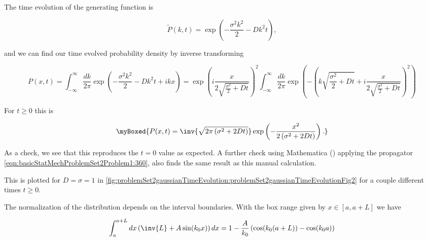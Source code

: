 {The time evolution of the generating function is

\begin{dmath}\label{eqn:basicStatMechProblemSet2Problem1:300}
\tilde{P}(k, t) 
= 
\exp\left(
-\frac{\sigma^2 k^2}{2} - D k^2 t
\right),
\end{dmath}

and we can find our time evolved probability density by inverse transforming

\begin{dmath}\label{eqn:basicStatMechProblemSet2Problem1:320}
P(x, t) 
= 
\int_{-\infty}^\infty \frac{dk}{2 \pi} 
\exp\left(
-\frac{\sigma^2 k^2}{2} - D k^2 t + i k x
\right)
=
\exp\left(
i \frac{x}{ 2 \sqrt{\frac{\sigma^2}{2} + D t} }
\right)^2
\int_{-\infty}^\infty \frac{dk}{2 \pi} 
\exp\left(
-\left(
k \sqrt{\frac{\sigma^2}{2} + D t} 
+ i \frac{x}{ 2 
\sqrt{\frac{\sigma^2}{2} + D t} 
}
\right)^2
\right)
\end{dmath}

For $t \ge 0$ this is

\begin{equation}\label{eqn:basicStatMechProblemSet2Problem1:340}
\myBoxed{
P(x, t) 
=
\inv{\sqrt{2 \pi \left( \sigma^2 + 2 D t \right) } }
\exp\left(
-\frac{x^2}{2 \left( \sigma^2 + 2 D t \right) }
\right).
}
\end{equation}

As a check, we see that this reproduces the $t = 0$ value as expected.  A further check using Mathematica () applying the propagator \ref{eqn:basicStatMechProblemSet2Problem1:360}, also finds the same result as this manual calculation.

This is plotted for $D = \sigma = 1$ in \cref{fig:problemSet2gaussianTimeEvolution:problemSet2gaussianTimeEvolutionFig2} for a couple different times $t \ge 0$.



The normalization of the distribution depends on the interval boundaries.  With the box range given by $x \in [a, a + L]$ we have

\begin{equation}\label{eqn:basicStatMechProblemSet2Problem1:380}
\int_a^{a + L} dx \left( \inv{L} + A \sin( k_0 x) \right) dx
=
1 - \frac{A}{k_0} \left( \cos( k_0(a + L) ) - \cos( k_0 a ) \right)
\end{equation}

}
